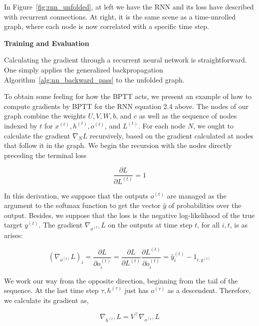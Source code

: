 In Figure~\ref{fig:rnn_unfolded}, at left we have the RNN and its loss have described with recurrent connections.
At right, it is the same scene as a time-unrolled graph,
where each node is now correlated with a specific time step.


{\large \textbf{Training and Evaluation}}

Calculating the gradient through a recurrent neural network is straightforward.
One simply applies the generalized backpropagation Algorithm~\ref{alg:nn_backward_pass} to the unfolded graph.

To obtain some feeling for how the BPTT acts, we present an example of how to compute gradients by BPTT for the RNN equation 2.4 above.
The nodes of our graph combine the weights $U, V, W, b$, and $c$ as well as the sequence of nodes indexed by $t$ for $x^{(t)}, h^{(t)}, o^{(t)}$, and $L^{(t)}$.
For each node $N$, we ought to calculate the gradient $\nabla_N L$ recursively, based on the gradient calculated at nodes that follow it in the graph.
We begin the recursion with the nodes directly preceding the terminal loss

\begin{equation}
    \frac{\partial L}{\partial L^{(t)}} = 1\label{eq:equation10}
\end{equation}

In this derivation, we suppose that the outputs $o^{(t)}$ are managed as the argument to the softmax function to get the vector $\hat{y}$ of probabilities over the output.
Besides, we suppose that the loss is the negative log-likelihood of the true target $y^{(t)}$.
The gradient $\nabla_{o^{(t)}} L$ on the outputs at time step $t$, for all $i, t$, is as arises:

\begin{equation}
    (\nabla_{o^{(t)}} L)_i = \frac{\partial L}{\partial o^{(t)}_i} = \frac{\partial L}{\partial L^{(t)}} \frac{\partial L^{(t)}}{\partial o^{(t)}_i} = \hat{y}^{(t)}_i - 1_{i,y^{(t)}}\label{eq:equation11}
\end{equation}

We work our way from the opposite direction, beginning from the tail of the sequence.
At the last time step $\tau, h^{(\tau)}$ just has $o^{(\tau)}$ as a descendent.
Therefore, we calculate its gradient as,

\begin{equation}
    \nabla_{h^{(t)}} L = V^\top \nabla_{o^{(t)}} L\label{eq:equation12}
\end{equation}

